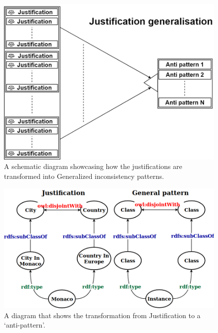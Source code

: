 \documentclass[11pt,letterpaper ,oneside ]{book}
\begin{document}
\begin{figure}
	\centering
	\includegraphics[width=\linewidth]{images/PatternGeneralizing.png}
	\caption{A schematic diagram showcasing how the justifications are transformed into Generalized inconsistency patterns.}
	\label{fig:PatternGeneralizing}
\end{figure}
\begin{figure}
	\centering
	\includegraphics[width=\linewidth]{images/JustificationtoGeneral.png}
	\caption{A diagram that shows the transformation from Justification to a `anti-pattern'.}
	\label{fig:JustificationtoGeneral}
\end{figure}
\end{document}
